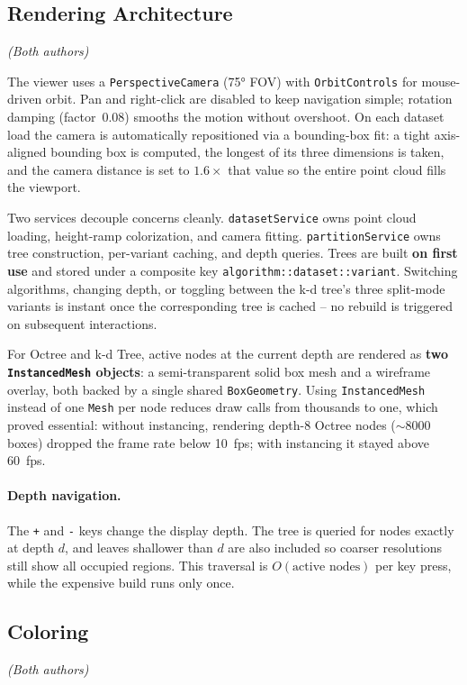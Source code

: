 \documentclass[12pt,a4paper]{article}
\begin{document}
\subsection{Rendering Architecture}
\textit{(Both authors)}

The viewer uses a \texttt{PerspectiveCamera} (75° FOV) with
\texttt{OrbitControls} for mouse-driven orbit. Pan and right-click are
disabled to keep navigation simple; rotation damping (factor~0.08) smooths
the motion without overshoot. On each dataset load the camera is automatically
repositioned via a bounding-box fit: a tight axis-aligned bounding box is
computed, the longest of its three dimensions is taken, and the camera distance
is set to $1.6\times$ that value so the entire point cloud fills the viewport.

Two services decouple concerns cleanly. \texttt{datasetService} owns point
cloud loading, height-ramp colorization, and camera fitting.
\texttt{partitionService} owns tree construction, per-variant caching, and
depth queries. Trees are built \textbf{on first use} and stored under a
composite key \texttt{algorithm::dataset::variant}. Switching algorithms,
changing depth, or toggling between the k-d tree's three split-mode variants
is instant once the corresponding tree is cached -- no rebuild is triggered on
subsequent interactions.

For Octree and k-d Tree, active nodes at the current depth are rendered as
\textbf{two \texttt{InstancedMesh} objects}: a semi-transparent solid box mesh
and a wireframe overlay, both backed by a single shared \texttt{BoxGeometry}.
Using \texttt{InstancedMesh} instead of one \texttt{Mesh} per node reduces
draw calls from thousands to one, which proved essential: without instancing,
rendering depth-8 Octree nodes ($\sim$8000 boxes) dropped the frame rate below
10~fps; with instancing it stayed above 60~fps.

\paragraph{Depth navigation.}
The \texttt{+} and \texttt{-} keys change the display depth. The tree is
queried for nodes exactly at depth $d$, and leaves shallower than $d$ are also
included so coarser resolutions still show all occupied regions. This traversal
is $O(\text{active nodes})$ per key press, while the expensive build runs only
once.

\subsection{Coloring}
\textit{(Both authors)}
\end{document}
